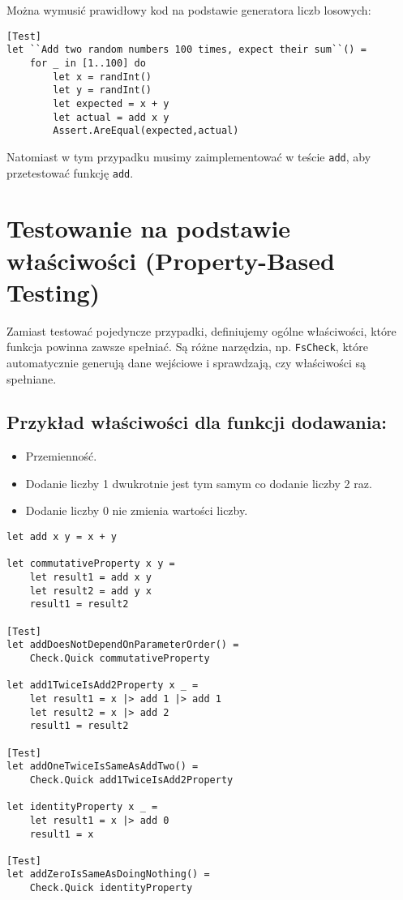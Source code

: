 Można wymusić prawidłowy kod na podstawie generatora liczb losowych:
\lstset{language=FSharp, basicstyle=\scriptsize}
\begin{lstlisting}[frame=single,caption={Przykładowe rozwiązanie},label=kod:listingA]
[Test]
let ``Add two random numbers 100 times, expect their sum``() =
    for _ in [1..100] do
        let x = randInt()
        let y = randInt()
        let expected = x + y
        let actual = add x y
        Assert.AreEqual(expected,actual)
\end{lstlisting}

Natomiast w tym przypadku musimy zaimplementować w teście \texttt{add}, aby przetestować funkcję \texttt{add}.

\section*{Testowanie na podstawie właściwości (Property-Based Testing)}

Zamiast testować pojedyncze przypadki, definiujemy ogólne właściwości, które funkcja powinna zawsze spełniać. Są różne narzędzia, np. \texttt{FsCheck}, które automatycznie generują dane wejściowe i sprawdzają, czy właściwości są spełniane.

\subsection*{Przykład właściwości dla funkcji dodawania:}
\begin{itemize}
    \item Przemienność.
    \item Dodanie liczby 1 dwukrotnie jest tym samym co dodanie liczby 2 raz.
    \item Dodanie liczby 0 nie zmienia wartości liczby.
\end{itemize}

\lstset{language=FSharp, basicstyle=\scriptsize}
\begin{lstlisting}[frame=single,caption={Testowanie na właściwościach},label=kod:add_all_properties]
let add x y = x + y

let commutativeProperty x y =
    let result1 = add x y
    let result2 = add y x 
    result1 = result2

[Test]
let addDoesNotDependOnParameterOrder() =
    Check.Quick commutativeProperty

let add1TwiceIsAdd2Property x _ =
    let result1 = x |> add 1 |> add 1
    let result2 = x |> add 2
    result1 = result2

[Test]
let addOneTwiceIsSameAsAddTwo() =
    Check.Quick add1TwiceIsAdd2Property

let identityProperty x _ =
    let result1 = x |> add 0
    result1 = x

[Test]
let addZeroIsSameAsDoingNothing() =
    Check.Quick identityProperty
\end{lstlisting}

